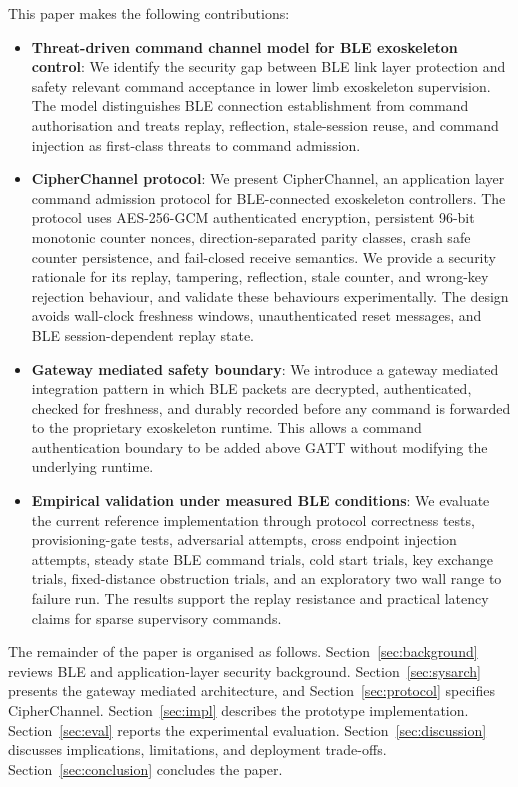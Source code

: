\documentclass[journal]{IEEEtran}
\begin{document}
This paper makes the following contributions:

\begin{itemize}
  \item \textbf{Threat-driven command channel model for BLE exoskeleton control}: We identify the security gap between BLE link layer protection and safety relevant command acceptance in lower limb exoskeleton supervision. The model distinguishes BLE connection establishment from command authorisation and treats replay, reflection, stale-session reuse, and command injection as first-class threats to command admission.

  \item \textbf{CipherChannel protocol}: We present CipherChannel, an application layer command admission protocol for BLE-connected exoskeleton controllers. The protocol uses AES-256-GCM authenticated encryption, persistent 96-bit monotonic counter nonces, direction-separated parity classes, crash safe counter persistence, and fail-closed receive semantics. We provide a security rationale for its replay, tampering, reflection, stale counter, and wrong-key rejection behaviour, and validate these behaviours experimentally. The design avoids wall-clock freshness windows, unauthenticated reset messages, and BLE session-dependent replay state.

  \item \textbf{Gateway mediated safety boundary}: We introduce a gateway mediated integration pattern in which BLE packets are decrypted, authenticated, checked for freshness, and durably recorded before any command is forwarded to the proprietary exoskeleton runtime. This allows a command authentication boundary to be added above GATT without modifying the underlying runtime.

  \item \textbf{Empirical validation under measured BLE conditions}: We evaluate the current reference implementation through protocol correctness tests, provisioning-gate tests, adversarial attempts, cross endpoint injection attempts, steady state BLE command trials, cold start trials, key exchange trials, fixed-distance obstruction trials, and an exploratory two wall range to failure run. The results support the replay resistance and practical latency claims for sparse supervisory commands.
\end{itemize}

The remainder of the paper is organised as follows. Section~\ref{sec:background} reviews BLE and application-layer security background. Section~\ref{sec:sysarch} presents the gateway mediated architecture, and Section~\ref{sec:protocol} specifies CipherChannel. Section~\ref{sec:impl} describes the prototype implementation. Section~\ref{sec:eval} reports the experimental evaluation. Section~\ref{sec:discussion} discusses implications, limitations, and deployment trade-offs. Section~\ref{sec:conclusion} concludes the paper.
\end{document}
